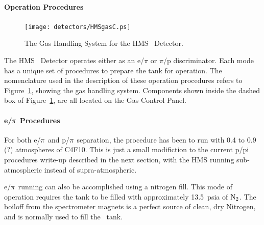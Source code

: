\paragraph{Operation Procedures}

\begin{figure}
\texttt{[image: detectors/HMSgasC.ps]}
\caption{The Gas Handling System for the HMS \Cerenkov\ Detector. \label{fig:gas}}
\end{figure}

The HMS \Cerenkov\ Detector operates either as an e/$\pi$ or $\pi$/p
discriminator. Each mode has a unique set of procedures to prepare the tank
for operation. The nomenclature used in the description of these operation
procedures refers to Figure~\ref{fig:gas}, showing the gas handling system. Components 
shown
inside the dashed box of Figure~\ref{fig:gas}, are all located on the Gas Control Panel.

\paragraph{e/$\bf{\pi}$ Procedures}
For both e/$\bf{\pi}$ and p/$\bf{\pi}$ separation, the procedure 
has been to run with 0.4 to
0.9 (?) atmospheres of C4F10.  This is just a small modifiction to the
current p/pi procedures write-up described in the next section,
with the HMS running sub-atmospheric instead of supra-atmospheric. 

e/$\bf{\pi}$ running can also be accomplished using a nitrogen fill.
This mode of operation requires the tank to be filled with approximately
13.5~psia of $\rm{N_2}$.  The boiloff from the spectrometer magnets is a
perfect source of clean, dry Nitrogen, and is normally used to fill the
\Cerenkov\ tank.

